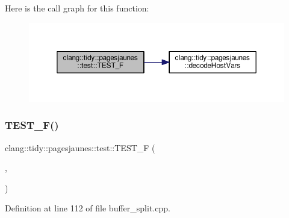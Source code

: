 Here is the call graph for this function\+:
\nopagebreak
\begin{figure}[H]
\begin{center}
\leavevmode
\includegraphics[width=350pt]{namespaceclang_1_1tidy_1_1pagesjaunes_1_1test_af9355848f58738817b5a349ac368a6a9_cgraph}
\end{center}
\end{figure}
\mbox{\label{namespaceclang_1_1tidy_1_1pagesjaunes_1_1test_ad2c5a5690cd7d1cada077f8555327570}} 
\subsubsection{\texorpdfstring{T\+E\+S\+T\+\_\+\+F()}{TEST\_F()}\hspace{0.1cm}{\footnotesize\ttfamily [29/57]}}
{\footnotesize\ttfamily clang\+::tidy\+::pagesjaunes\+::test\+::\+T\+E\+S\+T\+\_\+F (\begin{DoxyParamCaption}\item[{\hyperlink{classclang_1_1tidy_1_1pagesjaunes_1_1test_1_1_buffer_split_test}{Buffer\+Split\+Test}}]{,  }\item[{Empty\+Buffer}]{ }\end{DoxyParamCaption})}



Definition at line 112 of file buffer\+\_\+split.\+cpp.

